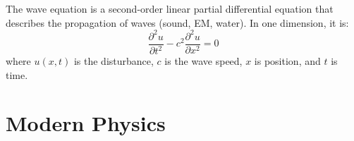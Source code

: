 \documentclass[11pt]{report}
\begin{document}
\begin{definition}
    The wave equation is a second-order linear partial differential equation that describes the propagation of waves (sound, EM, water). In one dimension, it is:
    \begin{equation}
        \frac{\partial^2 u}{\partial t^2} - c^2 \frac{\partial^2 u}{\partial x^2} = 0
    \end{equation}
    where $u(x,t)$ is the disturbance, $c$ is the wave speed, $x$ is position, and $t$ is time.
\end{definition}



\chapter{Modern Physics}
\end{document}

